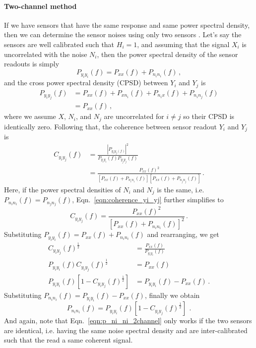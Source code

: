 \paragraph{Two-channel method}

If we have sensors that have the same response and same power spectral density, then we can determine the sensor noises using only two sensors \cite{technique_for_measurement_of_the_noise}.
Let's say the sensors are well calibrated such that $H_i=1$, and assuming that the signal $X_i$ is uncorrelated with the noise $N_i$, then the power spectral density of the sensor readouts is simply
\begin{equation}
	P_{y_iy_i}(f) = P_{xx}(f) + P_{n_i n_i}(f)\,,
\end{equation}
and the cross power spectral density (CPSD) between $Y_i$ and $Y_j$ is
\begin{equation}
	\begin{split}
	P_{y_iy_j}(f) &= P_{xx}(f) + P_{xn_i}(f) + P_{n_ix}(f) + P_{n_in_j}(f) \\
	&= P_{xx}(f)\,,
	\end{split}
\end{equation}
where we assume $X$, $N_i$, and $N_j$ are uncorrelated for $i\neq j$ so their CPSD is identically zero.
Following that, the coherence between sensor readout $Y_i$ and $Y_j$ is
\begin{equation}
	\begin{split}
	C_{y_iy_j}(f) &= \frac{\left\lvert P_{y_iy_j(f)}\right\rvert^2}{P_{y_iy_i}(f)P_{y_jy_j}(f)}\\
	&= \frac{P_{xx}(f)^2}{\left[P_{xx}(f)+P_{n_i n_i}(f)\right]\left[P_{xx}(f)+P_{n_j n_j}(f)\right]} \,.
	\end{split}
	\label{eqn:coherence_yi_yj}
\end{equation}
Here, if the power spectral densities of $N_i$ and $N_j$ is the same, i.e. $P_{n_in_i}(f)=P_{n_jn_j}(f)$, Eqn.~\eqref{eqn:coherence_yi_yj} further simplifies to
\begin{equation}
	C_{y_iy_j}(f) = \frac{P_{xx}(f)^2}{\left[P_{xx}(f)+P_{n_i n_i}(f)\right]^2}\,.
\end{equation}
Substituting $P_{y_i y_i}(f) = P_{xx}(f) + P_{n_i n_i}(f)$ and rearranging, we get
\begin{equation}
	\begin{split}
		C_{y_iy_j}(f)^\frac{1}{2} &= \frac{P_{xx}(f)}{P_{y_iy_i}(f)} \\
		P_{y_iy_i}(f)C_{y_iy_j}(f)^\frac{1}{2} &= P_{xx}(f) \\
		P_{y_iy_i}(f)\left[1-C_{y_iy_j}(f)^\frac{1}{2}\right] &= P_{y_iy_i}(f) - P_{xx}(f)\,.
	\end{split}
\end{equation}
Substituting $P_{n_i n_i}(f) = P_{y_i y_i}(f) - P_{xx}(f)$, finally we obtain
\begin{equation}
	\boxed{
		P_{n_i n_i}(f) = P_{y_iy_i}(f)\left[1-C_{y_iy_j}(f)^\frac{1}{2}\right]
	}\,\ .
	\label{eqn:p_ni_ni_2channel}
\end{equation}
And again, note that Eqn.~\eqref{eqn:p_ni_ni_2channel} only works if the two sensors are identical, i.e. having the same noise spectral density and are inter-calibrated such that the read a same coherent signal.

